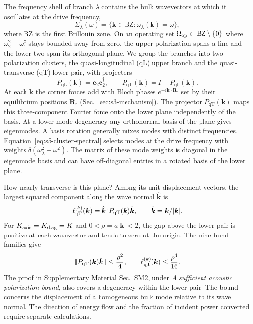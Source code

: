 \documentclass[10pt,aps,onecolumn,floatfix,notitlepage,nofootinbib,showkeys]{revtex4-2}
\newcommand{\vk}{\bm{k}}
\newcommand{\ve}{\bm{e}}
\newcommand{\vR}{\bm{R}}
\newcommand{\BZ}{\mathrm{BZ}}
\newcommand{\qT}{\mathrm{qT}}
\newcommand{\PqT}{P_{\mathrm{qT}}}
\newcommand{\PqL}{P_{\mathrm{qL}}}
\begin{document}
The frequency shell of branch $\lambda$ contains the bulk wavevectors at which it oscillates at the drive frequency,
\begin{equation}
  \Sigma_\lambda(\omega)
  =\{\vk\in\BZ:\omega_\lambda(\vk)=\omega\},
  \label{eq:s4-branch-shell}
\end{equation}
where $\BZ$ is the first Brillouin zone. On an operating set $\Omega_{\rm op}\subset\BZ\setminus\{0\}$ where $\omega_2^2-\omega_1^2$ stays bounded away from zero, the upper polarization spans a line and the lower two span its orthogonal plane. We group the branches into two polarization clusters, the quasi-longitudinal (qL) upper branch and the quasi-transverse (qT) lower pair, with projectors
\begin{equation}
  \PqL(\vk)=\ve_2\ve_2^\dagger,
  \qquad
  \PqT(\vk)=I-\PqL(\vk).
  \label{eq:s4-cluster-projectors}
\end{equation}
At each $\vk$ the corner forces add with Bloch phases $e^{-i\vk\cdot\vR_r}$ set by their equilibrium positions $\vR_r$ (Sec.~\ref{sec:s3-mechanism}). The projector $\PqT(\vk)$ maps this three-component Fourier force onto the lower plane independently of the basis. At a lower-mode degeneracy any orthonormal basis of the plane gives eigenmodes. A basis rotation generally mixes modes with distinct frequencies. Equation~\eqref{eq:s5-cluster-spectral} selects modes at the drive frequency with weights $\delta(\omega_\lambda^2-\omega^2)$. The matrix of these mode weights is diagonal in the eigenmode basis and can have off-diagonal entries in a rotated basis of the lower plane.

How nearly transverse is this plane? Among its unit displacement vectors, the largest squared component along the wave normal $\hat{\vk}$ is
\begin{equation}
  \ell_{\rm qT}^{(k)}(\vk)
  =\hat{\vk}^{\dagger}\PqT(\vk)\hat{\vk},
  \qquad \hat{\vk}=\vk/|\vk|.
  \label{eq:s4-cluster-leakage}
\end{equation}
For $K_{\rm axis}=K_{\rm diag}=K$ and $0<\rho=a|\vk|<2$, the gap above the lower pair is positive at each wavevector and tends to zero at the origin. The nine bond families give
\[
 \|P_{\qT}(\vk)\hat{\vk}\|\leq\frac{\rho^2}{4},
 \qquad
 \ell_{\rm qT}^{(k)}(\vk)\leq\frac{\rho^4}{16}.
\]
The proof in Supplementary Material Sec.~SM2, under \emph{A sufficient acoustic polarization bound}, also covers a degeneracy within the lower pair. The bound concerns the displacement of a homogeneous bulk mode relative to its wave normal. The direction of energy flow and the fraction of incident power converted require separate calculations.
\end{document}
